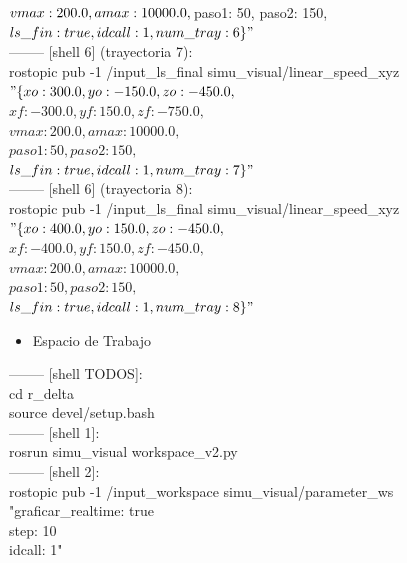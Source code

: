 $vmax: 200.0, amax: 10000.0,\\
$paso1: 50,  paso2: 150,\\
$ls\_fin: true, idcall: 1, num\_tray: 6\}"$\\
-------- [shell 6] (trayectoria 7):\\
rostopic pub -1 /input\_ls\_final simu\_visual/linear\_speed\_xyz\\ 
$"\{xo: 300.0, yo: -150.0, zo: -450.0,$\\
$xf: -300.0, yf: 150.0, zf: -750.0,$\\
$vmax: 200.0, amax: 10000.0,$\\
$paso1: 50,  paso2: 150,$\\
$ls\_fin: true, idcall: 1, num\_tray: 7\}"$\\
-------- [shell 6] (trayectoria 8):\\
rostopic pub -1 /input\_ls\_final simu\_visual/linear\_speed\_xyz\\ 
$"\{xo: 400.0, yo: 150.0, zo: -450.0,$\\
$xf: -400.0, yf: 150.0, zf: -450.0,$\\
$vmax: 200.0, amax: 10000.0,$\\
$paso1: 50,  paso2: 150,$\\
$ls\_fin: true, idcall: 1, num\_tray: 8\}"$\\

    \begin{itemize}
        \item Espacio de Trabajo
    \end{itemize}
-------- [shell TODOS]:\\
cd r\_delta\\
source devel/setup.bash\\
-------- [shell 1]:\\
rosrun simu\_visual workspace\_v2.py\\
-------- [shell 2]:\\
rostopic pub -1 /input\_workspace simu\_visual/parameter\_ws "graficar\_realtime: true\\
step: 10\\
idcall: 1"\\

    
    
    
    
    
    
    \newpage
    
